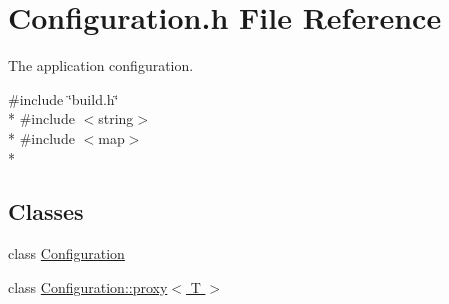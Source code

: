 \section{Configuration.\-h File Reference}
\label{_configuration_8h}


The application configuration.  


{\ttfamily \#include \char`\"{}build.\-h\char`\"{}}\\*
{\ttfamily \#include $<$string$>$}\\*
{\ttfamily \#include $<$map$>$}\\*
\subsection*{Classes}
\begin{DoxyCompactItemize}
\item 
class \hyperlink{class_configuration}{Configuration}
\item 
class \hyperlink{class_configuration_1_1proxy}{Configuration\-::proxy$<$ T $>$}
\end{DoxyCompactItemize}
